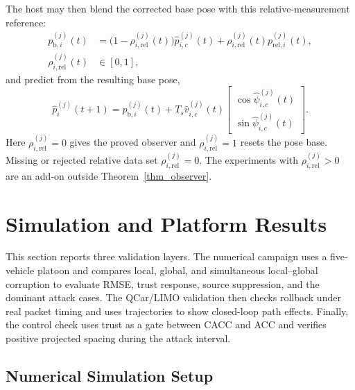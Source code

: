 \documentclass[letterpaper,journal]{IEEEtran}
\begin{document}
The host may then blend the corrected base pose with this relative-measurement reference:
\begin{equation}
\begin{aligned}
    p_{\mathrm b,i}^{(j)}(t)
    &=
    \big(1-\rho_{i,\mathrm{rel}}^{(j)}(t)\big)\hat p_{i,c}^{(j)}(t)
    +\rho_{i,\mathrm{rel}}^{(j)}(t)p_{\mathrm{rel},i}^{(j)}(t),
    \\
    \rho_{i,\mathrm{rel}}^{(j)}(t)&\in[0,1],
\end{aligned}
    \label{eq_pose_reanchor_base}
\end{equation}
and predict from the resulting base pose,
\begin{equation}
    \hat p_i^{(j)}(t+1)
    =
    p_{\mathrm b,i}^{(j)}(t)
    +T_s \hat v_{i,c}^{(j)}(t)
    \begin{bmatrix}
        \cos \hat\psi_{i,c}^{(j)}(t)\\
        \sin \hat\psi_{i,c}^{(j)}(t)
    \end{bmatrix}.
    \label{eq_pose_reanchor_prediction}
\end{equation}
Here $\rho_{i,\mathrm{rel}}^{(j)}=0$ gives the proved observer and $\rho_{i,\mathrm{rel}}^{(j)}=1$ resets the pose base. Missing or rejected relative data set $\rho_{i,\mathrm{rel}}^{(j)}=0$. The experiments with $\rho_{i,\mathrm{rel}}^{(j)}>0$ are an add-on outside Theorem~\ref{thm_observer}.



\section{Simulation and Platform Results}\label{sec_simulation}

This section reports three validation layers. The numerical campaign uses a five-vehicle platoon and compares local, global, and simultaneous local--global corruption to evaluate RMSE, trust response, source suppression, and the dominant attack cases. The QCar/LIMO validation then checks rollback under real packet timing and uses trajectories to show closed-loop path effects. Finally, the control check uses trust as a gate between CACC and ACC and verifies positive projected spacing during the attack interval.

\subsection{Numerical Simulation Setup}
\end{document}
